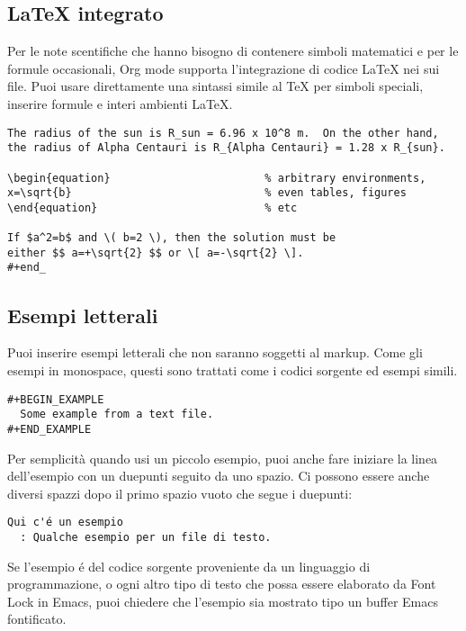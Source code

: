 \documentclass[11pt]{article}
\begin{document}
\subsection{\LaTeX{} integrato}
\label{sec:orge5e5c4d}
Per le note scentifiche che hanno bisogno di contenere simboli
matematici e per le formule occasionali, Org mode supporta
l'integrazione di codice \LaTeX{} nei sui file. Puoi usare direttamente
una sintassi simile al \TeX{} per simboli speciali, inserire formule e
interi ambienti \LaTeX{}.

\begin{verbatim}
The radius of the sun is R_sun = 6.96 x 10^8 m.  On the other hand,
the radius of Alpha Centauri is R_{Alpha Centauri} = 1.28 x R_{sun}.

\begin{equation}                        % arbitrary environments,
x=\sqrt{b}                              % even tables, figures
\end{equation}                          % etc

If $a^2=b$ and \( b=2 \), then the solution must be
either $$ a=+\sqrt{2} $$ or \[ a=-\sqrt{2} \].
#+end_
\end{verbatim}

\subsection{Esempi letterali}
\label{sec:org513e2ea}
Puoi inserire esempi letterali che non saranno soggetti al
markup. Come gli esempi in monospace, questi sono trattati come i
codici sorgente ed esempi simili.

\begin{verbatim}
#+BEGIN_EXAMPLE
  Some example from a text file.
#+END_EXAMPLE
\end{verbatim}

Per semplicità quando usi un piccolo esempio, puoi anche fare iniziare
la linea dell'esempio con un duepunti seguito da uno spazio. Ci
possono essere anche diversi spazzi dopo il primo spazio vuoto che
segue i duepunti:

\begin{verbatim}
Qui c'é un esempio
  : Qualche esempio per un file di testo.
\end{verbatim}

Se l'esempio é del codice sorgente proveniente da un linguaggio di
programmazione, o ogni altro tipo di testo che possa essere elaborato
da Font Lock in Emacs, puoi chiedere che l'esempio sia mostrato tipo
un buffer Emacs fontificato.
\end{document}
